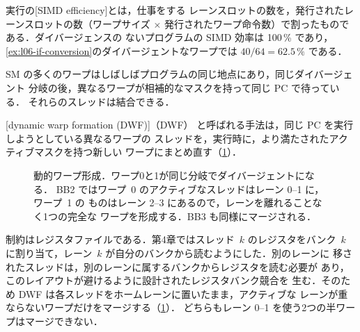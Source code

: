\documentclass[../main.tex]{subfiles}
\begin{document}
\begin{definition}[SIMD 効率]
  \label{def:l06-simd-efficiency}
  実行の[SIMD efficiency]とは，仕事をする
  レーンスロットの数を，発行されたレーンスロットの数（ワープサイズ
  $\times$ 発行されたワープ命令数）で割ったものである．ダイバージェンスの
  ないプログラムの SIMD 効率は 100\,\% であり，
  \cref{ex:l06-if-conversion}のダイバージェントなワープでは
  $40/64 = 62.5\,\%$ である．
\end{definition}

SM の多くのワープはしばしばプログラムの同じ地点にあり，同じダイバージェント
分岐の後，異なるワープが相補的なマスクを持って同じ PC で待っている．
それらのスレッドは結合できる．

\begin{definition}[動的ワープ形成]
  \label{def:l06-dwf}
  [dynamic warp formation (DWF)]（DWF）
  と呼ばれる手法は，同じ PC を実行しようとしている異なるワープの
  スレッドを，実行時に，より満たされたアクティブマスクを持つ新しい
  ワープにまとめ直す（\cref{fig:l06-dwf}）．
\end{definition}

\begin{figure}[tb]
  \centering
  
  \caption{動的ワープ形成．ワープ0と1が同じ分岐でダイバージェントになる．
    BB2 ではワープ~0 のアクティブなスレッドはレーン 0--1 に，ワープ~1 の
    ものはレーン 2--3 にあるので，レーンを離れることなく1つの完全な
    ワープを形成する．BB3 も同様にマージされる．}
  \label{fig:l06-dwf}
\end{figure}

制約はレジスタファイルである．第4章ではスレッド~$k$ のレジスタをバンク~$k$
に割り当て，レーン~$k$ が自分のバンクから読むようにした．別のレーンに
移されたスレッドは，別のレーンに属するバンクからレジスタを読む必要が
あり，このレイアウトが避けるように設計されたレジスタバンク競合を
生む．そのため DWF は各スレッドをホームレーンに置いたまま，アクティブな
レーンが重ならないワープだけをマージする（\cref{fig:l06-dwf}）．
どちらもレーン 0--1 を使う2つの半ワープはマージできない．
\end{document}

